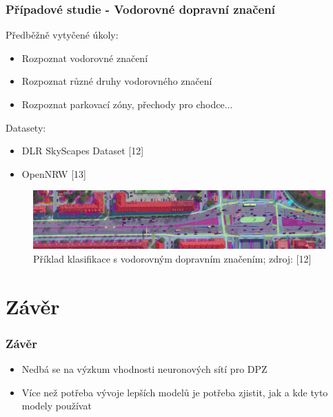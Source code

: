 \documentclass[10pt, t]{beamer}
\begin{document}
\begin{frame}

\frametitle{Případové studie - Vodorovné dopravní značení}

Předběžně vytyčené úkoly:

\begin{itemize}
	\item Rozpoznat vodorovné značení
	\item Rozpoznat různé druhy vodorovného značení
	\item Rozpoznat parkovací zóny, přechody pro chodce...
\end{itemize}

Datasety:

\begin{itemize}
	\item DLR SkyScapes Dataset [12]
	\item OpenNRW [13]
\end{itemize}

\begin{figure}[h]
   \centering
	\includegraphics[width=\linewidth]{../pictures/horizontal-traffic-signs.jpg}
	\caption[]{Příklad klasifikace s vodorovným dopravním značením; zdroj: [12]}
\end{figure}

\end{frame}


\section{Závěr}


\begin{frame}

\frametitle{Závěr}

\begin{itemize}
	\item Nedbá se na výzkum vhodnosti neuronových sítí pro DPZ
	\item Více než potřeba vývoje lepších modelů je potřeba zjistit, jak a kde tyto modely používat
\end{itemize}

\end{frame}
\end{document}
